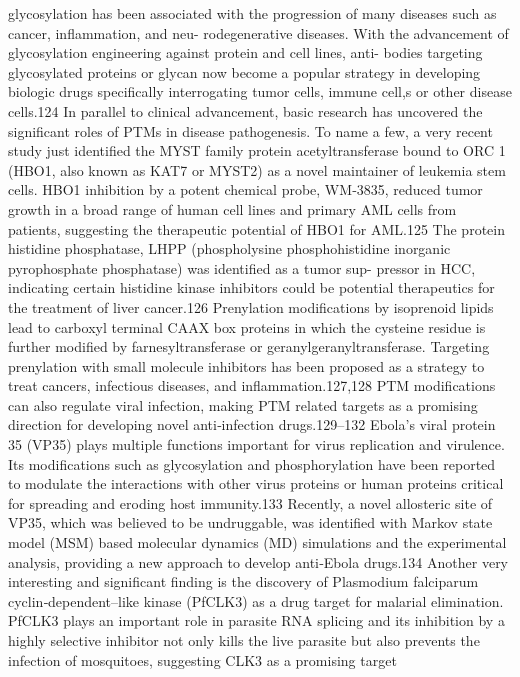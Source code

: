 glycosylation has been associated with the progression of many diseases such as cancer, inflammation, and neu-
rodegenerative diseases. With the advancement of glycosylation engineering against protein and cell lines, anti-
bodies targeting glycosylated proteins or glycan now become a popular strategy in developing biologic drugs
specifically interrogating tumor cells, immune cell,s or other disease cells.124
In parallel to clinical advancement, basic research has uncovered the significant roles of PTMs in disease
pathogenesis. To name a few, a very recent study just identified the MYST family protein acetyltransferase bound
to ORC 1 (HBO1, also known as KAT7 or MYST2) as a novel maintainer of leukemia stem cells. HBO1 inhibition by
a potent chemical probe, WM‐3835, reduced tumor growth in a broad range of human cell lines and primary AML
cells from patients, suggesting the therapeutic potential of HBO1 for AML.125 The protein histidine phosphatase,
LHPP (phospholysine phosphohistidine inorganic pyrophosphate phosphatase) was identified as a tumor sup-
pressor in HCC, indicating certain histidine kinase inhibitors could be potential therapeutics for the treatment of
liver cancer.126 Prenylation modifications by isoprenoid lipids lead to carboxyl terminal CAAX box proteins in
which the cysteine residue is further modified by farnesyltransferase or geranylgeranyltransferase. Targeting
prenylation with small molecule inhibitors has been proposed as a strategy to treat cancers, infectious diseases,
and inflammation.127,128 PTM modifications can also regulate viral infection, making PTM related targets as a
promising direction for developing novel anti‐infection drugs.129–132 Ebola's viral protein 35 (VP35) plays multiple
functions important for virus replication and virulence. Its modifications such as glycosylation and phosphorylation
have been reported to modulate the interactions with other virus proteins or human proteins critical for spreading
and eroding host immunity.133 Recently, a novel allosteric site of VP35, which was believed to be undruggable, was
identified with Markov state model (MSM) based molecular dynamics (MD) simulations and the experimental
analysis, providing a new approach to develop anti‐Ebola drugs.134 Another very interesting and significant finding
is the discovery of Plasmodium falciparum cyclin‐dependent–like kinase (PfCLK3) as a drug target for malarial
elimination. PfCLK3 plays an important role in parasite RNA splicing and its inhibition by a highly selective inhibitor
not only kills the live parasite but also prevents the infection of mosquitoes, suggesting CLK3 as a promising target
